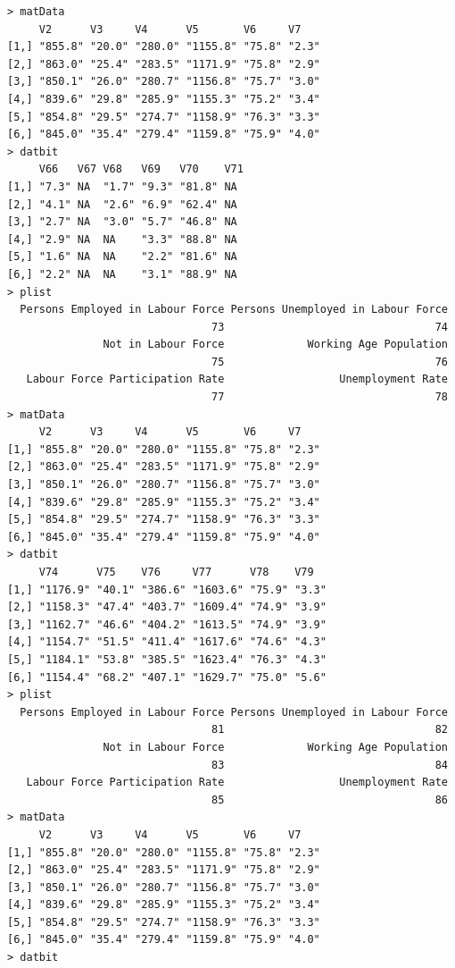 \documentclass[a4paper]{article}
\begin{document}
\begin{verbatim}
> matData 
     V2      V3     V4      V5       V6     V7   
[1,] "855.8" "20.0" "280.0" "1155.8" "75.8" "2.3"
[2,] "863.0" "25.4" "283.5" "1171.9" "75.8" "2.9"
[3,] "850.1" "26.0" "280.7" "1156.8" "75.7" "3.0"
[4,] "839.6" "29.8" "285.9" "1155.3" "75.2" "3.4"
[5,] "854.8" "29.5" "274.7" "1158.9" "76.3" "3.3"
[6,] "845.0" "35.4" "279.4" "1159.8" "75.9" "4.0"
> datbit 
     V66   V67 V68   V69   V70    V71
[1,] "7.3" NA  "1.7" "9.3" "81.8" NA 
[2,] "4.1" NA  "2.6" "6.9" "62.4" NA 
[3,] "2.7" NA  "3.0" "5.7" "46.8" NA 
[4,] "2.9" NA  NA    "3.3" "88.8" NA 
[5,] "1.6" NA  NA    "2.2" "81.6" NA 
[6,] "2.2" NA  NA    "3.1" "88.9" NA 
> plist 
  Persons Employed in Labour Force Persons Unemployed in Labour Force 
                                73                                 74 
               Not in Labour Force             Working Age Population 
                                75                                 76 
   Labour Force Participation Rate                  Unemployment Rate 
                                77                                 78 
> matData 
     V2      V3     V4      V5       V6     V7   
[1,] "855.8" "20.0" "280.0" "1155.8" "75.8" "2.3"
[2,] "863.0" "25.4" "283.5" "1171.9" "75.8" "2.9"
[3,] "850.1" "26.0" "280.7" "1156.8" "75.7" "3.0"
[4,] "839.6" "29.8" "285.9" "1155.3" "75.2" "3.4"
[5,] "854.8" "29.5" "274.7" "1158.9" "76.3" "3.3"
[6,] "845.0" "35.4" "279.4" "1159.8" "75.9" "4.0"
> datbit 
     V74      V75    V76     V77      V78    V79  
[1,] "1176.9" "40.1" "386.6" "1603.6" "75.9" "3.3"
[2,] "1158.3" "47.4" "403.7" "1609.4" "74.9" "3.9"
[3,] "1162.7" "46.6" "404.2" "1613.5" "74.9" "3.9"
[4,] "1154.7" "51.5" "411.4" "1617.6" "74.6" "4.3"
[5,] "1184.1" "53.8" "385.5" "1623.4" "76.3" "4.3"
[6,] "1154.4" "68.2" "407.1" "1629.7" "75.0" "5.6"
> plist 
  Persons Employed in Labour Force Persons Unemployed in Labour Force 
                                81                                 82 
               Not in Labour Force             Working Age Population 
                                83                                 84 
   Labour Force Participation Rate                  Unemployment Rate 
                                85                                 86 
> matData 
     V2      V3     V4      V5       V6     V7   
[1,] "855.8" "20.0" "280.0" "1155.8" "75.8" "2.3"
[2,] "863.0" "25.4" "283.5" "1171.9" "75.8" "2.9"
[3,] "850.1" "26.0" "280.7" "1156.8" "75.7" "3.0"
[4,] "839.6" "29.8" "285.9" "1155.3" "75.2" "3.4"
[5,] "854.8" "29.5" "274.7" "1158.9" "76.3" "3.3"
[6,] "845.0" "35.4" "279.4" "1159.8" "75.9" "4.0"
> datbit 

\end{verbatim}
\end{document}

